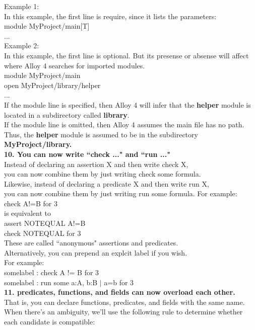 \documentclass[a4paper,12pt]{extarticle}
\begin{document}
Example 1: \\
In this example, the first line is require, since it lists the parameters: \\
module MyProject/main[T]\\
... \\
Example 2: \\
In this example, the first line is optional. But its presense or absense will affect where Alloy 4 searches for imported modules. \\
module MyProject/main\\
open MyProject/library/helper\\
... \\
If the module line is specified, then Alloy 4 will infer that the \textbf{helper} module is located in a subdirectory called \textbf{library}. \\
If the module line is omitted, then Alloy 4 assumes the main file has no path. Thus, the \textbf{helper} module is assumed to be in the subdirectory \textbf{MyProject/library.} \\
\textbf{10. You can now write ``check {...}" and ``run {...}"} \\
Instead of declaring an assertion X and then write check X,\\
you can now combine them by just writing check {some formula}. \\
Likewise, instead of declaring a predicate X and then write run X,\\
you can now combine them by just writing run {some formula}.
For example:\\
  check { A!=B } for 3\\
is equivalent to\\
  assert NOTEQUAL { A!=B }\\
  check NOTEQUAL for 3 \\
These are called ``anonymous" assertions and predicates.\\
Alternatively, you can prepend an explcit label if you wish.\\
For example: \\
somelabel : check { A != B } for 3 \\
somelabel : run { some a:A, b:B $|$ a=b } for 3  \\
\textbf{11. predicates, functions, and fields can now overload each other.} \\
That is, you can declare functions, predicates, and fields with the same name. When there's an ambiguity, we'll use the following rule to determine whether each candidate is compatible: \\
\end{document}
